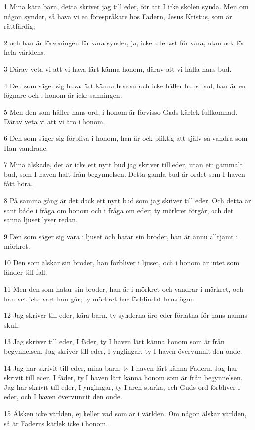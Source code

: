 \par 1 Mina kära barn, detta skriver jag till eder, för att I icke skolen synda. Men om någon syndar, så hava vi en förespråkare hos Fadern, Jesus Kristus, som är rättfärdig;
\par 2 och han är försoningen för våra synder, ja, icke allenast för våra, utan ock för hela världens.
\par 3 Därav veta vi att vi hava lärt känna honom, därav att vi hålla hans bud.
\par 4 Den som säger sig hava lärt känna honom och icke håller hans bud, han är en lögnare och i honom är icke sanningen.
\par 5 Men den som håller hans ord, i honom är förvisso Guds kärlek fullkomnad. Därav veta vi att vi äro i honom.
\par 6 Den som säger sig förbliva i honom, han är ock pliktig att själv så vandra som Han vandrade.
\par 7 Mina älskade, det är icke ett nytt bud jag skriver till eder, utan ett gammalt bud, som I haven haft från begynnelsen. Detta gamla bud är ordet som I haven fått höra.
\par 8 På samma gång är det dock ett nytt bud som jag skriver till eder. Och detta är sant både i fråga om honom och i fråga om eder; ty mörkret förgår, och det sanna ljuset lyser redan.
\par 9 Den som säger sig vara i ljuset och hatar sin broder, han är ännu alltjämt i mörkret.
\par 10 Den som älskar sin broder, han förbliver i ljuset, och i honom är intet som länder till fall.
\par 11 Men den som hatar sin broder, han är i mörkret och vandrar i mörkret, och han vet icke vart han går; ty mörkret har förblindat hans ögon.
\par 12 Jag skriver till eder, kära barn, ty synderna äro eder förlåtna för hans namns skull.
\par 13 Jag skriver till eder, I fäder, ty I haven lärt känna honom som är från begynnelsen. Jag skriver till eder, I ynglingar, ty I haven övervunnit den onde.
\par 14 Jag har skrivit till eder, mina barn, ty I haven lärt känna Fadern. Jag har skrivit till eder, I fäder, ty I haven lärt känna honom som är från begynnelsen. Jag har skrivit till eder, I ynglingar, ty I ären starka, och Guds ord förbliver i eder, och I haven övervunnit den onde.
\par 15 Älsken icke världen, ej heller vad som är i världen. Om någon älskar världen, så är Faderns kärlek icke i honom.
